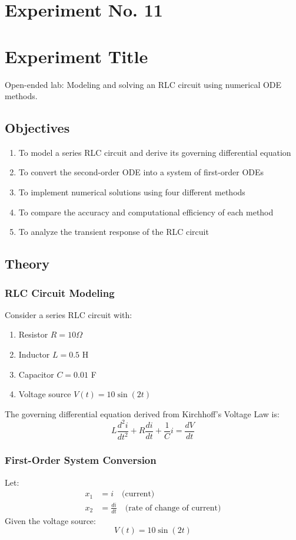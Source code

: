 \documentclass[a4paper,12pt]{article}
\begin{document}
	\section{Experiment No. 11}
	
	\section{Experiment Title}
	Open-ended lab: Modeling and solving an RLC circuit using numerical ODE methods.
	
	
	\subsection{Objectives}
	\begin{enumerate}
		\item To model a series RLC circuit and derive its governing differential equation
		\item To convert the second-order ODE into a system of first-order ODEs
		\item To implement numerical solutions using four different methods
		\item To compare the accuracy and computational efficiency of each method
		\item To analyze the transient response of the RLC circuit
	\end{enumerate}
	
	\subsection{Theory}
	\subsubsection*{RLC Circuit Modeling}
	Consider a series RLC circuit with:
	\begin{enumerate}
		\item Resistor $R = 10\Omega$
		\item Inductor $L = 0.5$ H
		\item Capacitor $C = 0.01$ F
		\item Voltage source $V(t) = 10\sin(2t)$
	\end{enumerate}
	
	The governing differential equation derived from Kirchhoff's Voltage Law is:
	\[
	L\frac{d^2i}{dt^2} + R\frac{di}{dt} + \frac{1}{C}i = \frac{dV}{dt}
	\]
	
	\subsubsection*{First-Order System Conversion}
	Let:
	\begin{align*}
		x_1 &= i \quad \text{(current)} \\
		x_2 &= \frac{di}{dt} \quad \text{(rate of change of current)}
	\end{align*}
		Given the voltage source:
	\[
	V(t) = 10\sin(2t)
	\]
	
\end{document}
